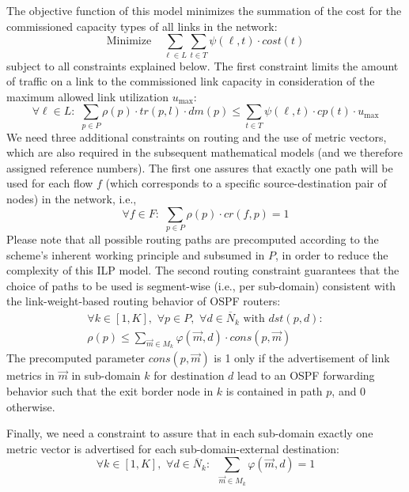 \documentclass[journal]{IEEEtran}
\begin{document}
The objective function of this model minimizes the summation of the cost for the commissioned capacity types of all links in the network:
\begin{equation*}
\text{Minimize}\,\,\,\,\,\, \sum_{\ell\in L} \sum_{t\in T} \psi(\ell , t) \cdot cost(t)
\end{equation*}
subject to all constraints explained below. The first constraint limits the amount of traffic on a link to the commissioned link capacity in consideration of the maximum allowed link utilization $u_\text{max}$:
\begin{equation*}
\forall \ell\in L: \,\,\sum_{p\in P} \rho(p) \cdot tr(p, l) \cdot dm(p) 
\leq \sum_{t\in T} \psi(\ell , t) \cdot cp(t) \cdot u_\text{max}
\end{equation*}
We need three additional constraints on routing and the use of metric vectors, which are also required in the subsequent mathematical models (and we therefore assigned reference numbers). The first one assures that exactly one path will be used for each flow $f$ (which corresponds to a specific source-destination pair of nodes) in the network, i.e., 
\begin{equation}\label{eq1}
\forall f\in F: \,\, \sum_{p\in P} \rho(p) \cdot cr(f,p)=1
\end{equation}
Please note that all possible routing paths are precomputed according to the scheme's inherent working principle and subsumed in $P$, in order to reduce the complexity of this ILP model. The second routing constraint guarantees that the choice of paths to be used is segment-wise (i.e., per sub-domain) consistent with the link-weight-based routing behavior of OSPF routers:
\begin{multline}\label{eq2}
\forall k\in [1,K], \,\, \forall p\in P, \,\,  \forall d\in\overline{N}_k \,\, \text{with} \,\, dst(p,d):\\
\rho(p) \leq \sum_{\vec{m}\in M_k} \varphi (\vec{m}, d) \cdot cons(p,\vec{m}) \,\,\,\,\,\,\,\,\,
\end{multline}
The precomputed parameter $cons(p,\vec{m})$ is 1 only if the advertisement of link metrics in $\vec{m}$ in sub-domain $k$ for destination $d$ lead to an OSPF forwarding behavior such that the exit border node in $k$ is contained in path $p$, and 0 otherwise.

Finally, we need a constraint to assure that in each sub-domain exactly one metric vector is advertised for each sub-domain-external destination:
\begin{equation}\label{eq3}
\forall k\in [1,K], \,\, \forall d\in \overline{N}_k:   \,\,\, \sum_{\vec{m} \in M_k} \varphi (\vec{m},d) =1
\end{equation}
\end{document}
